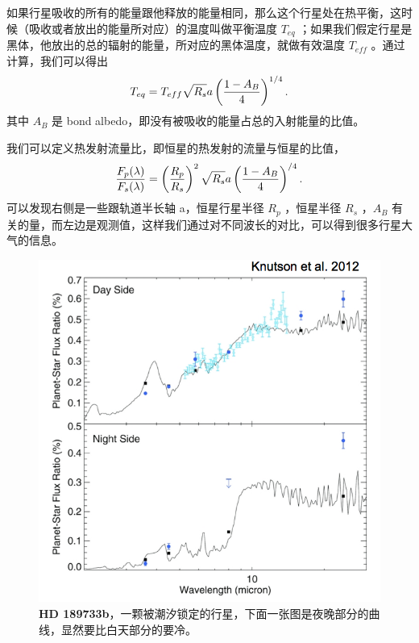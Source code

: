 \documentclass[letterpaper,10pt,english]{sphinxmanual}
\begin{document}
如果行星吸收的所有的能量跟他释放的能量相同，那么这个行星处在热平衡，这时候（吸收或者放出的能量所对应）的温度叫做平衡温度 \(T_{eq}\) ；如果我们假定行星是黑体，他放出的总的辐射的能量，所对应的黑体温度，就做有效温度 \(T_{eff}\) 。通过计算，我们可以得出
\begin{gather}
\begin{split}T_{eq} = T_{eff}\sqrt{R_s}{a}\left(\frac{1-A_B}{4}\right)^{1/4}.\end{split}\notag
\end{gather}
其中 \(A_B\) 是 bond albedo，即没有被吸收的能量占总的入射能量的比值。

我们可以定义热发射流量比，即恒星的热发射的流量与恒星的比值，
\begin{gather}
\begin{split}\frac{F_p(\lambda)}{F_s(\lambda)} = \left(\frac{R_p}{R_s}\right)^2 \sqrt{R_s}{a}\left(\frac{1-A_B}{4}\right)^{/4}.\end{split}\notag
\end{gather}
可以发现右侧是一些跟轨道半长轴 a，恒星行星半径 \(R_p\) ，恒星半径 \(R_s\) ，\(A_B\) 有关的量，而左边是观测值，这样我们通过对不同波长的对比，可以得到很多行星大气的信息。
\begin{figure}[htbp]
\centering
\capstart

\includegraphics{hd189733b.png}
\caption{\textbf{HD 189733b}，一颗被潮汐锁定的行星，下面一张图是夜晚部分的曲线，显然要比白天部分的要冷。}\end{figure}
\end{document}

